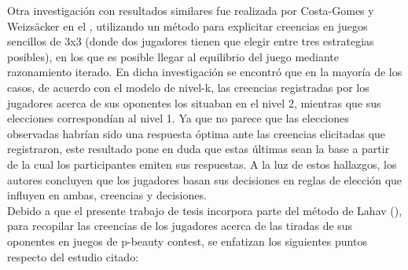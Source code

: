 Otra investigación con resultados similares fue realizada por Costa-Gomes y Weizsäcker en el \citeyear{Costa-Gomes}, utilizando un método para explicitar creencias en juegos sencillos de 3x3 (donde dos jugadores tienen que elegir entre tres estrategias posibles), en los que es posible llegar al equilibrio del juego mediante razonamiento iterado. En dicha investigación se encontró que en la mayoría de los casos, de acuerdo con el modelo de nivel-k, las creencias registradas por los jugadores acerca de sus oponentes los situaban en el nivel 2, mientras que sus elecciones correspondían al nivel 1. Ya que no parece que las elecciones observadas habrían sido una respuesta óptima ante las creencias elicitadas que registraron, este resultado pone en duda que estas últimas sean la base a partir de la cual los participantes emiten sus respuestas. A la luz de estos hallazgos, los autores concluyen que los jugadores basan sus decisiones en reglas de elección que influyen en ambas, creencias y decisiones.\\

Debido a que el presente trabajo de tesis incorpora parte del método de Lahav (\citeyear{Lahav}), para recopilar las creencias de los jugadores acerca de las tiradas de sus oponentes en juegos de p-beauty contest, se enfatizan los siguientes puntos respecto del estudio citado: \\


